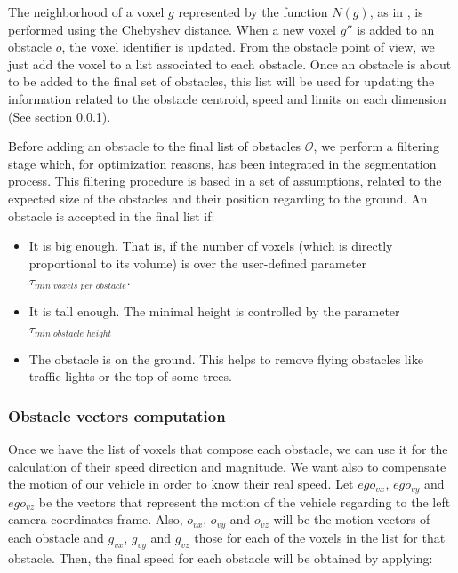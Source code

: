 The neighborhood of a voxel $g$ represented by the function $N(g)$, as in \cite{broggi2013}, is performed using the Chebyshev distance. When a new voxel $g''$ is added to an obstacle $o$, the voxel identifier is updated. From the obstacle point of view, we just add the voxel to a list associated to each obstacle. Once an obstacle is about to be added to the final set of obstacles, this list will be used for updating the information related to the obstacle centroid, speed and limits on each dimension (See section \ref{ch:chapter05_01_05_01}).

Before adding an obstacle to the final list of obstacles $\mathcal{O}$, we perform a filtering stage which, for optimization reasons, has been integrated in the segmentation process. This filtering procedure is based in a set of assumptions, related to the expected size of the obstacles and their position regarding to the ground. An obstacle is accepted in the final list if:

\begin{itemize}
 \item It is big enough. That is, if the number of voxels (which is directly proportional to its volume) is over the user-defined parameter $\tau_{min\_voxels\_per\_obstacle}$.
 \item It is tall enough. The minimal height is controlled by the parameter $\tau_{min\_obstacle\_height}$
 \item The obstacle is on the ground. This helps to remove flying obstacles like traffic lights or the top of some trees.
\end{itemize}

\subsubsection{Obstacle vectors computation}\label{ch:chapter05_01_05_01}

Once we have the list of voxels that compose each obstacle, we can use it for the calculation of their speed direction and magnitude. We want also to compensate the motion of our vehicle in order to know their real speed. Let $ego_{vx}$, $ego_{vy}$ and $ego_{vz}$ be the vectors that represent the motion of the vehicle regarding to the left camera coordinates frame. Also, $o_{vx}$, $o_{vy}$ and $o_{vz}$ will be the motion vectors of each obstacle and $g_{vx}$, $g_{vy}$ and $g_{vz}$ those for each of the voxels in the list for that obstacle. Then, the final speed for each obstacle will be obtained by applying:

